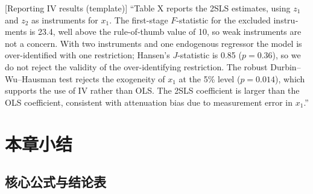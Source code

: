 \begin{english}[Reporting IV results (template)]
``Table X reports the 2SLS estimates, using $z_1$ and $z_2$ as instruments for $x_1$. The first-stage $F$-statistic for the excluded instruments is 23.4, well above the rule-of-thumb value of 10, so weak instruments are not a concern. With two instruments and one endogenous regressor the model is over-identified with one restriction; Hansen's $J$-statistic is 0.85 ($p=0.36$), so we do not reject the validity of the over-identifying restriction. The robust Durbin--Wu--Hausman test rejects the exogeneity of $x_1$ at the 5\% level ($p=0.014$), which supports the use of IV rather than OLS. The 2SLS coefficient is larger than the OLS coefficient, consistent with attenuation bias due to measurement error in $x_1$.''
\end{english}

\section{本章小结}\label{sec:U09-summary}

\subsection{核心公式与结论表}

